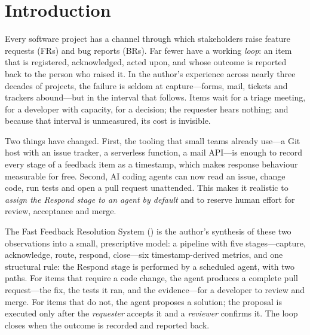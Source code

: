 \section{Introduction}
Every software project has a channel through which stakeholders raise feature requests (FRs) and bug reports (BRs). Far fewer have a working \emph{loop}: an item that is registered, acknowledged, acted upon, and whose outcome is reported back to the person who raised it. In the author's experience across nearly three decades of projects, the failure is seldom at capture---forms, mail, tickets and trackers abound---but in the interval that follows. Items wait for a triage meeting, for a developer with capacity, for a decision; the requester hears nothing; and because that interval is unmeasured, its cost is invisible.

Two things have changed. First, the tooling that small teams already use---a Git host with an issue tracker, a serverless function, a mail API---is enough to record every stage of a feedback item as a timestamp, which makes response behaviour measurable for free. Second, AI coding agents can now read an issue, change code, run tests and open a pull request unattended. This makes it realistic to \emph{assign the Respond stage to an agent by default} and to reserve human effort for review, acceptance and merge.

The Fast Feedback Resolution System (\ffrs) is the author's synthesis of these two observations into a small, prescriptive model: a pipeline with five stages---capture, acknowledge, route, respond, close---six timestamp-derived metrics, and one structural rule: the Respond stage is performed by a scheduled agent, with two paths. For items that require a code change, the agent produces a complete pull request---the fix, the tests it ran, and the evidence---for a developer to review and merge. For items that do not, the agent proposes a solution; the proposal is executed only after the \emph{requester} accepts it and a \emph{reviewer} confirms it. The loop closes when the outcome is recorded and reported back.

